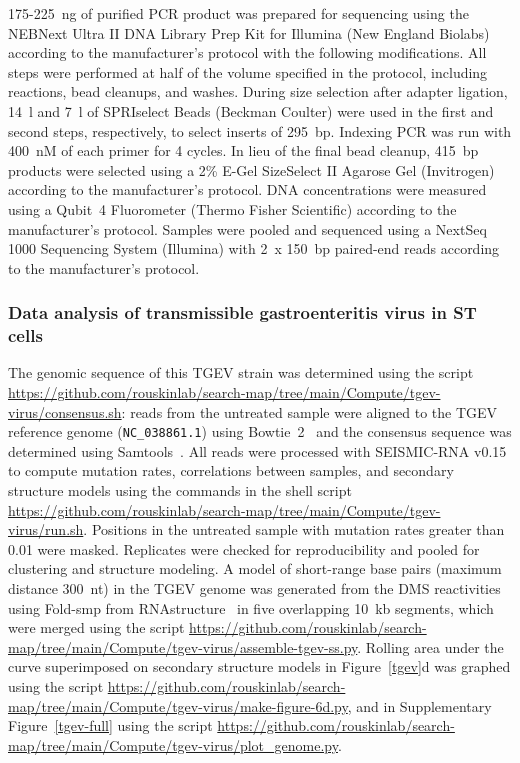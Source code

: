 \documentclass[main.tex]{subfiles}
\begin{document}
175-225~ng of purified PCR product was prepared for sequencing using the NEBNext Ultra II DNA Library Prep Kit for Illumina (New England Biolabs) according to the manufacturer's protocol with the following modifications.
All steps were performed at half of the volume specified in the protocol, including reactions, bead cleanups, and washes.
During size selection after adapter ligation, 14~\textmu l and 7~\textmu l of SPRIselect Beads (Beckman Coulter) were used in the first and second steps, respectively, to select inserts of 295~bp.
Indexing PCR was run with 400~nM of each primer for 4 cycles.
In lieu of the final bead cleanup, 415~bp products were selected using a 2\% E-Gel SizeSelect II Agarose Gel (Invitrogen) according to the manufacturer's protocol.
DNA concentrations were measured using a Qubit~4 Fluorometer (Thermo Fisher Scientific) according to the manufacturer's protocol.
Samples were pooled and sequenced using a NextSeq 1000 Sequencing System (Illumina) with 2~x 150~bp paired-end reads according to the manufacturer's protocol.

\subsubsection{Data analysis of transmissible gastroenteritis virus in ST cells}

The genomic sequence of this TGEV strain was determined using the script \url{https://github.com/rouskinlab/search-map/tree/main/Compute/tgev-virus/consensus.sh}: reads from the untreated sample were aligned to the TGEV reference genome (\verb|NC_038861.1|) using Bowtie~2~\cite{Langmead2012} and the consensus sequence was determined using Samtools~\cite{Li2009}.
All reads were processed with SEISMIC-RNA v0.15 to compute mutation rates, correlations between samples, and secondary structure models using the commands in the shell script \url{https://github.com/rouskinlab/search-map/tree/main/Compute/tgev-virus/run.sh}.
Positions in the untreated sample with mutation rates greater than 0.01 were masked.
Replicates were checked for reproducibility and pooled for clustering and structure modeling.
A model of short-range base pairs (maximum distance 300~nt) in the TGEV genome was generated from the DMS reactivities using Fold-smp from RNAstructure~\cite{Reuter2010} in five overlapping 10~kb segments, which were merged using the script \url{https://github.com/rouskinlab/search-map/tree/main/Compute/tgev-virus/assemble-tgev-ss.py}.
Rolling area under the curve superimposed on secondary structure models in Figure~\ref{tgev}d was graphed using the script \url{https://github.com/rouskinlab/search-map/tree/main/Compute/tgev-virus/make-figure-6d.py}, and in Supplementary Figure~\ref{tgev-full} using the script \url{https://github.com/rouskinlab/search-map/tree/main/Compute/tgev-virus/plot_genome.py}.
\end{document}
